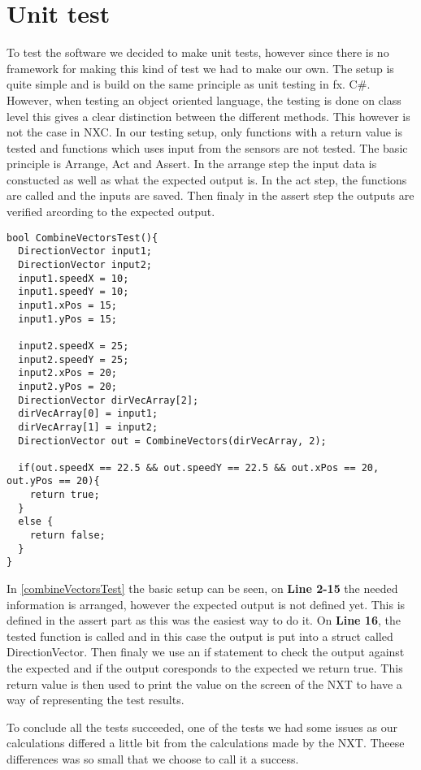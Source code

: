 \section{Unit test}

To test the software we decided to make unit tests, however since there is no
framework for making this kind of test we had to make our own. The setup is
quite simple and is build on the same principle as unit testing in fx. C\#.
However, when testing an object oriented language, the testing is done on class
level this gives a clear distinction between the different methods. This however
is not the case in NXC. In our testing setup, only functions with a return
value is tested and functions which uses input from the sensors are not
tested. The basic principle is Arrange, Act and Assert. In the arrange step the
input data is constucted as well as what the expected output is. In the act
step, the functions are called and the inputs are saved. Then finaly in the
assert step the outputs are verified arcording to the expected output. \nl

\begin{minipage}[H]{\linewidth}
\begin{lstlisting}[caption =Unit Test for Combine Vectors,label=combineVectorsTest] 
bool CombineVectorsTest(){
  DirectionVector input1;
  DirectionVector input2;
  input1.speedX = 10;
  input1.speedY = 10;
  input1.xPos = 15;
  input1.yPos = 15;
  
  input2.speedX = 25;
  input2.speedY = 25;
  input2.xPos = 20;
  input2.yPos = 20;
  DirectionVector dirVecArray[2];
  dirVecArray[0] = input1;
  dirVecArray[1] = input2;
  DirectionVector out = CombineVectors(dirVecArray, 2);
  
  if(out.speedX == 22.5 && out.speedY == 22.5 && out.xPos == 20, out.yPos == 20){
    return true;
  }
  else {
    return false;
  }
}
\end{lstlisting}
\end{minipage}

In \autoref{combineVectorsTest} the basic setup can be seen, on \textbf{Line
2-15} the needed information is arranged, however the expected output is not
defined yet. This is defined in the assert part as this was the easiest way to
do it. On \textbf{Line 16}, the tested function is called and in this case the
output is put into a struct called DirectionVector. Then finaly we use an if
statement to check the output against the expected and if the output coresponds
to the expected we return true. This return value is then used to print the
value on the screen of the NXT to have a way of representing the test results.
\nl

To conclude all the tests succeeded, one of the tests we had some issues as our
calculations differed a little bit from the calculations made by the NXT. Theese
differences was so small that we choose to call it a success. 
